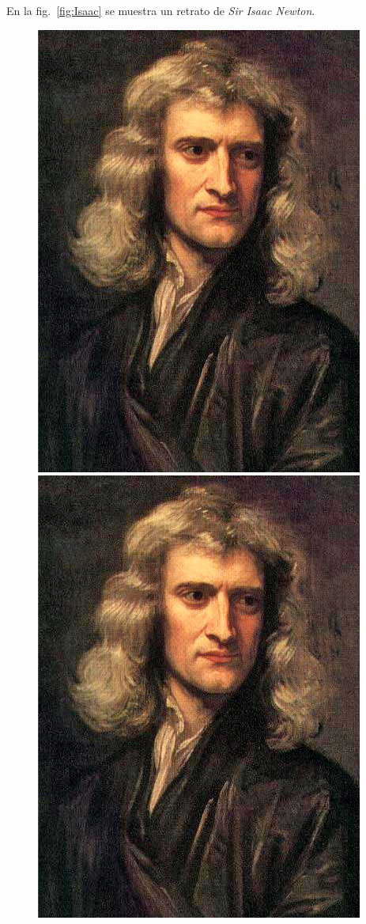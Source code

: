 \documentclass[11pt,letterpaper]{exam}
\begin{document}
\begin{questions}

\begin{mdframed}[style=mystyle]
\vspace{0.5cm}
En la fig.\ \ref{fig:Isaac} se muestra un retrato de \textit{Sir Isaac Newton}.

\begin{figure}[H]
\centering
\includegraphics[scale=0.3]{isaac}
\includegraphics[scale=0.2]{isaac}

\end{figure}
\end{mdframed}
\end{questions}
\end{document}
